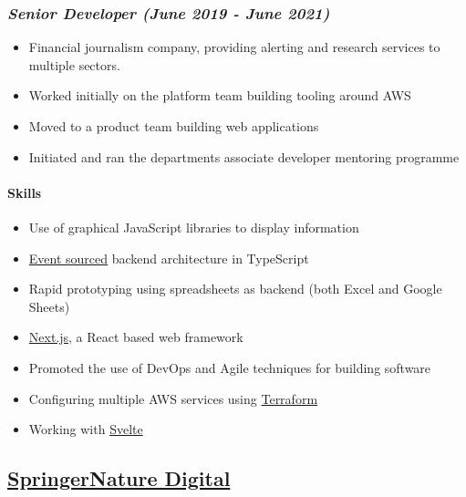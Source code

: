 \hypertarget{senior-developer-june-2019---present}{%
\subsubsection{\texorpdfstring{\emph{Senior Developer (June 2019 - June
2021)}}{Senior Developer (June 2019 - June 2021)}}\label{senior-developer-june-2019---present}}

\begin{itemize}
\tightlist
\item
  Financial journalism company, providing alerting and research services
  to multiple sectors.
\item
  Worked initially on the platform team building tooling around AWS
\item
  Moved to a product team building web applications
\item
  Initiated and ran the departments associate developer mentoring
  programme
\end{itemize}

\hypertarget{skills-0}{%
\paragraph{Skills}\label{skills-0}}

\begin{itemize}
\tightlist
\item
  Use of graphical JavaScript libraries to display information
\item
  \href{https://martinfowler.com/eaaDev/EventSourcing.html}{Event
  sourced} backend architecture in TypeScript
\item
  Rapid prototyping using spreadsheets as backend (both Excel and Google
  Sheets)
\item
  \href{https://nextjs.org/}{Next.js}, a React based web framework
\item
  Promoted the use of DevOps and Agile techniques for building software
\item
  Configuring multiple AWS services using
  \href{https://www.terraform.io/}{Terraform}
\item
  Working with \href{https://svelte.dev/}{Svelte}
\end{itemize}

\hypertarget{springernature-digital}{%
\subsection{\texorpdfstring{\href{http://www.springernature.com}{SpringerNature
Digital}}{SpringerNature Digital}}\label{springernature-digital}}

